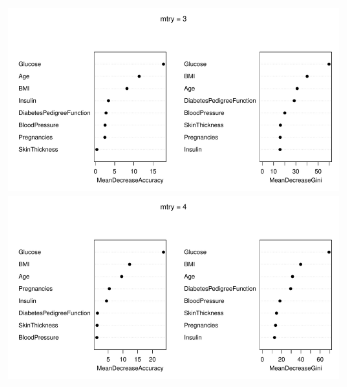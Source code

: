 
\begin{frame}%

\begin{figure}
\hspace*{-1.5em}\includegraphics[width=0.78\textwidth]{./Figures/forest/diabete_var_imp3.pdf}
\hspace*{-1.5em}\includegraphics[width=0.78\textwidth]{./Figures/forest/diabete_var_imp4.pdf}
\end{figure}
\end{frame}

